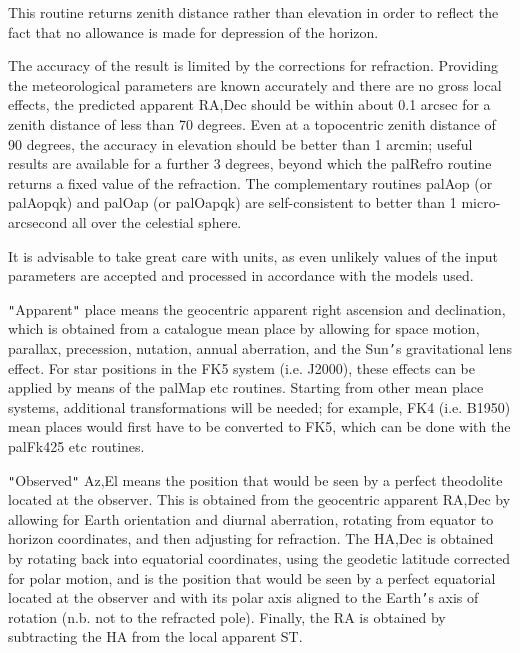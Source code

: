 \documentclass[twoside,11pt]{article}
\renewcommand{\_}{\texttt{\symbol{95}}}
\newcommand{\sstitem}{\item}
\newcommand{\sstitem}{\item}
\begin{document}
{{{         \sstitem
         This routine returns zenith distance rather than elevation
           in order to reflect the fact that no allowance is made for
           depression of the horizon.

         \sstitem
         The accuracy of the result is limited by the corrections for
           refraction.  Providing the meteorological parameters are
           known accurately and there are no gross local effects, the
           predicted apparent RA,Dec should be within about 0.1 arcsec
           for a zenith distance of less than 70 degrees.  Even at a
           topocentric zenith distance of 90 degrees, the accuracy in
           elevation should be better than 1 arcmin;  useful results
           are available for a further 3 degrees, beyond which the
           palRefro routine returns a fixed value of the refraction.
           The complementary routines palAop (or palAopqk) and palOap
           (or palOapqk) are self-consistent to better than 1 micro-
           arcsecond all over the celestial sphere.

         \sstitem
         It is advisable to take great care with units, as even
           unlikely values of the input parameters are accepted and
           processed in accordance with the models used.

         \sstitem
         {\tt "}Apparent{\tt "} place means the geocentric apparent right ascension
           and declination, which is obtained from a catalogue mean place
           by allowing for space motion, parallax, precession, nutation,
           annual aberration, and the Sun{\tt '}s gravitational lens effect.  For
           star positions in the FK5 system (i.e. J2000), these effects can
           be applied by means of the palMap etc routines.  Starting from
           other mean place systems, additional transformations will be
           needed;  for example, FK4 (i.e. B1950) mean places would first
           have to be converted to FK5, which can be done with the
           palFk425 etc routines.

         \sstitem
         {\tt "}Observed{\tt "} Az,El means the position that would be seen by a
           perfect theodolite located at the observer.  This is obtained
           from the geocentric apparent RA,Dec by allowing for Earth
           orientation and diurnal aberration, rotating from equator
           to horizon coordinates, and then adjusting for refraction.
           The HA,Dec is obtained by rotating back into equatorial
           coordinates, using the geodetic latitude corrected for polar
           motion, and is the position that would be seen by a perfect
           equatorial located at the observer and with its polar axis
           aligned to the Earth{\tt '}s axis of rotation (n.b. not to the
           refracted pole).  Finally, the RA is obtained by subtracting
           the HA from the local apparent ST.

}}}
\end{document}
